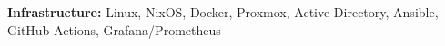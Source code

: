 \textbf{Infrastructure:} Linux, NixOS, Docker, Proxmox, Active Directory, Ansible, GitHub Actions, Grafana/Prometheus \\
